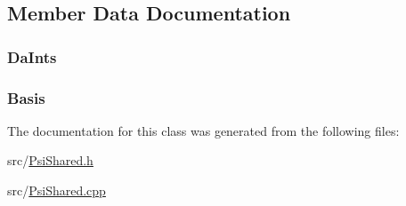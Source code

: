 \subsection{Member Data Documentation}
\hypertarget{classJKBuilder_1_1PsiIntManager_abff505bf91f526e978bc6abbf3e0cfc5}{
\subsubsection[{DaInts}]{ {\bf DaInts}}}
\label{classJKBuilder_1_1PsiIntManager_abff505bf91f526e978bc6abbf3e0cfc5}
\hypertarget{classJKBuilder_1_1PsiIntManager_a1328ec05e99c755f29d64d7ea56fee7e}{
\subsubsection[{Basis}]{ {\bf Basis}}}
\label{classJKBuilder_1_1PsiIntManager_a1328ec05e99c755f29d64d7ea56fee7e}


The documentation for this class was generated from the following files:\begin{DoxyCompactItemize}
\item 
src/\hyperlink{PsiShared_8h}{PsiShared.h}\item 
src/\hyperlink{PsiShared_8cpp}{PsiShared.cpp}\end{DoxyCompactItemize}
